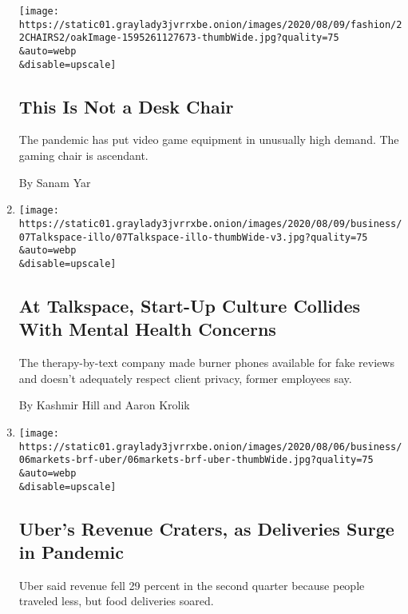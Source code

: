 \begin{enumerate}
  \texttt{[image: https://static01.graylady3jvrrxbe.onion/images/2020/08/09/fashion/22CHAIRS2/oakImage-1595261127673-thumbWide.jpg?quality=75\\\&auto=webp\\\&disable=upscale]}

  \hypertarget{this-is-not-a-desk-chair}{%
  \subsection{This Is Not a Desk Chair}\label{this-is-not-a-desk-chair}}

  The pandemic has put video game equipment in unusually high demand.
  The gaming chair is ascendant.

  By Sanam Yar
\item
  \href{/2020/08/07/technology/talkspace.html}{}

  \texttt{[image: https://static01.graylady3jvrrxbe.onion/images/2020/08/09/business/07Talkspace-illo/07Talkspace-illo-thumbWide-v3.jpg?quality=75\\\&auto=webp\\\&disable=upscale]}

  \hypertarget{at-talkspace-start-up-culture-collides-with-mental-health-concerns}{%
  \subsection{At Talkspace, Start-Up Culture Collides With Mental Health
  Concerns}\label{at-talkspace-start-up-culture-collides-with-mental-health-concerns}}

  The therapy-by-text company made burner phones available for fake
  reviews and doesn't adequately respect client privacy, former
  employees say.

  By Kashmir Hill and Aaron Krolik
\item
  \href{/2020/08/06/technology/uber-ride-hailing-delivery-coronavirus.html}{}

  \texttt{[image: https://static01.graylady3jvrrxbe.onion/images/2020/08/06/business/06markets-brf-uber/06markets-brf-uber-thumbWide.jpg?quality=75\\\&auto=webp\\\&disable=upscale]}

  \hypertarget{ubers-revenue-craters-as-deliveries-surge-in-pandemic}{%
  \subsection{Uber's Revenue Craters, as Deliveries Surge in
  Pandemic}\label{ubers-revenue-craters-as-deliveries-surge-in-pandemic}}

  Uber said revenue fell 29 percent in the second quarter because people
  traveled less, but food deliveries soared.


\end{enumerate}
